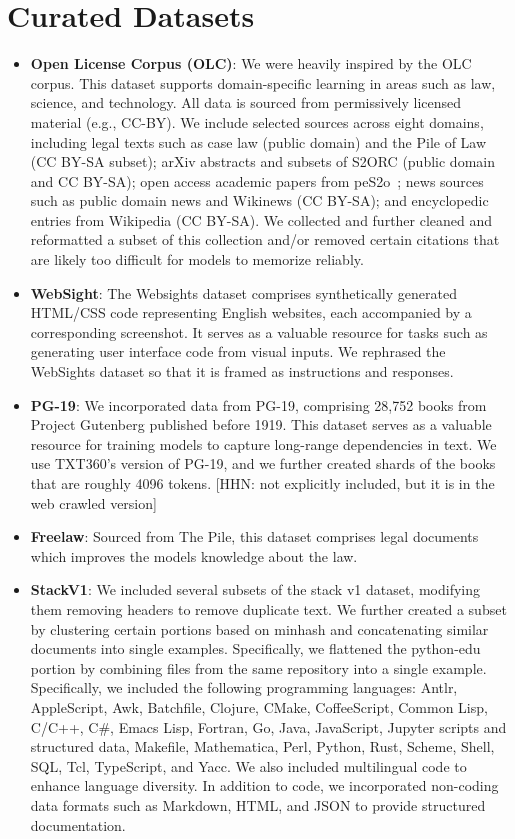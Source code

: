 \section{Curated Datasets}
\label{app:curated}
\begin{itemize}
\item \textbf{Open License Corpus (OLC)}: We were heavily inspired by the OLC corpus. This dataset supports domain-specific learning in areas such as law, science, and technology. All data is sourced from permissively licensed material (e.g., CC-BY). We include selected sources across eight domains, including legal texts such as case law (public domain) and the Pile of Law (CC BY-SA subset); arXiv abstracts and subsets of S2ORC (public domain and CC BY-SA); open access academic papers from peS2o~\citep{peS2o}; news sources such as public domain news and Wikinews (CC BY-SA); and encyclopedic entries from Wikipedia (CC BY-SA). We collected and further cleaned and reformatted a subset of this collection and/or removed certain citations that are likely too difficult for models to memorize reliably.

\item \textbf{WebSight}: The Websights dataset comprises synthetically generated HTML/CSS code representing English websites, each accompanied by a corresponding screenshot. It serves as a valuable resource for tasks such as generating user interface code from visual inputs. We rephrased the WebSights dataset so that it is framed as instructions and responses.

\item \textbf{PG-19}: We incorporated data from PG-19, comprising 28,752 books from Project Gutenberg published before 1919. This dataset serves as a valuable resource for training models to capture long-range dependencies in text. We use TXT360's version of PG-19, and we further created shards of the books that are roughly 4096 tokens. [HHN: not explicitly included, but it is in the web crawled version]

\item \textbf{Freelaw}: Sourced from The Pile, this dataset comprises legal documents which improves the models knowledge about the law.

\item \textbf{StackV1}: We included several subsets of the stack v1 dataset, modifying them removing headers to remove duplicate text. We further created a subset by clustering certain portions based on minhash and concatenating similar documents into single examples. Specifically, we flattened the python-edu portion by combining files from the same repository into a single example. Specifically, we included the following programming languages: Antlr, AppleScript, Awk, Batchfile, Clojure, CMake, CoffeeScript, Common Lisp, C/C++, C\#, Emacs Lisp, Fortran, Go, Java, JavaScript, Jupyter scripts and structured data, Makefile, Mathematica, Perl, Python, Rust, Scheme, Shell, SQL, Tcl, TypeScript, and Yacc. We also included multilingual code to enhance language diversity. In addition to code, we incorporated non-coding data formats such as Markdown, HTML, and JSON to provide structured documentation.


\end{itemize}
